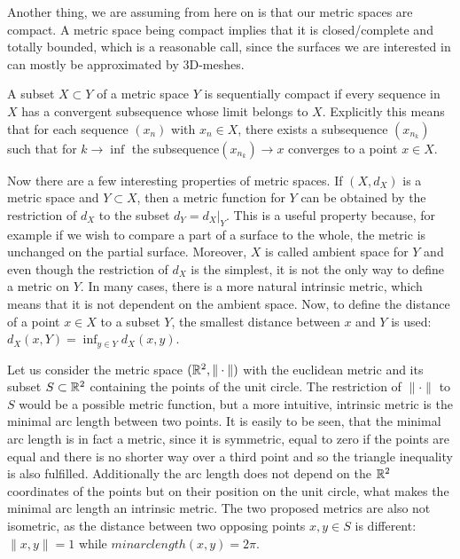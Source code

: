 Another thing, we are assuming from here on is that our metric spaces are compact.
A metric space being compact implies that it is closed/complete and totally bounded, which is a reasonable call, since the surfaces we are interested in can mostly be approximated by 3D-meshes.
\begin{mydef}
	A subset $X \subset Y$ of a metric space $Y$ is sequentially compact if every sequence in $X$ has a convergent subsequence whose limit belongs to $X$.
	Explicitly this means that for each sequence $(x_n)$ with $x_n \in X$, there exists a subsequence $(x_{n_k})$ such that for $k \rightarrow \inf$ the subsequence$(x_{n_k}) \rightarrow x$ converges to a point $x\in X$.
\end{mydef}

Now there are a few interesting properties of metric spaces.
If $(X,d_X)$ is a metric space and $Y \subset X$, then a metric function for $Y$ can be obtained by the restriction of $d_X$ to the subset $d_Y = \left.d_X\right|_Y$.
This is a useful property because, for example if we wish to compare a part of a surface to the whole, the metric is unchanged on the partial surface.
Moreover, $X$ is called ambient space for $Y$ and even though the restriction of $d_X$ is the simplest, it is not the only way to define a metric on $Y$.
In many cases, there is a more natural intrinsic metric, which means that it is not dependent on the ambient space.
Now, to define the distance of a point $x \in X$ to a subset $Y$, the smallest distance between $x$ and $Y$ is used: $d_X(x,Y) = \inf_{y \in Y} d_X(x,y)$.

\begin{example}
Let us consider the metric space $(\mathbb{R}^2, \|\cdot\|)$ with the euclidean metric and its subset $S \subset \mathbb{R}^2$ containing the points of the unit circle.
The restriction of $\|\cdot\|$ to $S$ would be a possible metric function, but a more intuitive, intrinsic metric is the minimal arc length between two points.
It is easily to be seen, that the minimal arc length is in fact a metric, since it is symmetric, equal to zero if the points are equal and there is no shorter way over a third point and so the triangle inequality is also fulfilled.
Additionally the arc length does not depend on the $\mathbb{R}^2$ coordinates of the points but on their position on the unit circle, what makes the minimal arc length an intrinsic metric.
The two proposed metrics are also not isometric, as the distance between two opposing points $x,y\in S$ is different: $\|x,y\| = 1$ while $minarclength(x,y) = 2\pi$.
\end{example}

